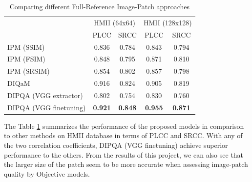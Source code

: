 \begin{table}[ht]
  \centering
  \begin{tabular}{|l|cc|cc|}
    \hline
    \multirow{2}{*}{} & \multicolumn{2}{c|}{ HMII (64x64) } & \multicolumn{2}{c|}{ HMII (128x128) } \\ \cline{2-5} 
    & PLCC              & SRCC            & PLCC               & SRCC             \\ \hline
    IPM (SSIM)             & 0.836             & 0.784            & 0.843              & 0.794             \\
    IPM (FSIM)             & 0.848             & 0.795            & 0.871              & 0.810             \\
    IPM (SRSIM)            & 0.854             & 0.802            & 0.857              & 0.798             \\
    DIQaM                  & 0.916             & 0.824            & 0.905              & 0.819             \\
    DIPQA (VGG extractor)  & 0.802             & 0.754            & 0.830              & 0.760             \\
    DIPQA (VGG finetuning) & \textbf{0.921}    & \textbf{0.848}   & \textbf{0.955}     & \textbf{0.871}    \\ \hline
  \end{tabular}
  \caption{Comparing different Full-Reference Image-Patch approaches}
  \label{tab:approachs}
\end{table}

The Table \ref{tab:approachs} summarizes the performance of the proposed models in comparison to other methods on HMII database in terms of PLCC and SRCC. With any of the two correlation coefficients, DIPQA (VGG finetuning) achieve superior performance to the others. From the results of this project, we can also see that the larger size of the patch seem to be more accurate when assessing image-patch quality by Objective models.
